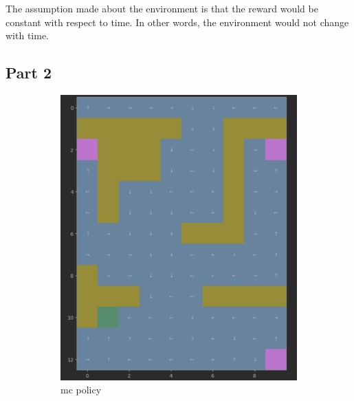 \documentclass{article}
\begin{document}
    The assumption made about the environment is that the reward would be constant with respect to time.
    In other words, the environment would not change with time.

    \subsection{Part 2}\label{subsec:question-2-2}
    \begin{figure}[h]
        \begin{subfigure} {0.5\textwidth}
            \includegraphics[width=0.9\linewidth]{images/mc_policy}
            \caption{mc policy}\label{fig:mc_policy}
        \end{subfigure}
        \begin{subfigure} {0.5\textwidth}

\end{subfigure}
\end{figure}
\end{document}
